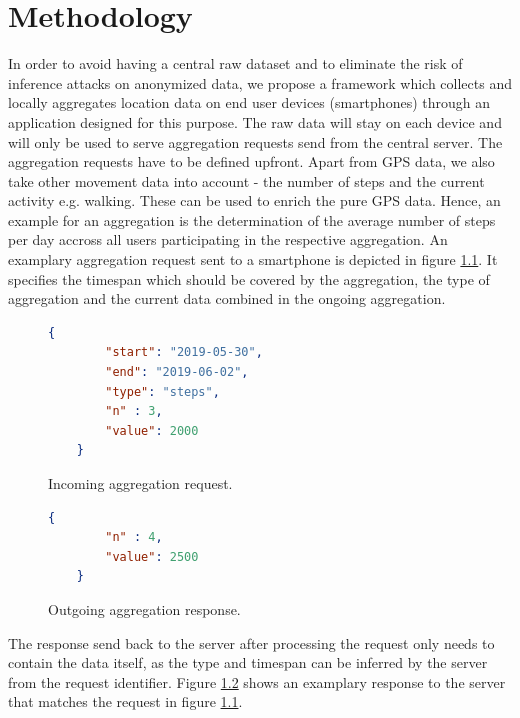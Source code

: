 \chapter{Methodology}\label{chapter:method}
In order to avoid having a central raw dataset and to eliminate the risk of inference attacks on anonymized data, we propose a framework which collects and locally aggregates location data on end user devices (smartphones) through an application designed for this purpose. The raw data will stay on each device and will only be used to serve aggregation requests send from the central server. The aggregation requests have to be defined upfront. Apart from GPS data, we also take other movement data into account - the number of steps and the current activity e.g. walking. These can be used to enrich the pure GPS data. Hence, an example for an aggregation is the determination of the average number of steps per day accross all users participating in the respective aggregation. An examplary aggregation request sent to a smartphone is depicted in figure \ref{incoming-aggregation-request}. It specifies the timespan which should be covered by the aggregation, the type of aggregation and the current data combined in the ongoing aggregation.

\begin{figure}[h!]
	\begin{lstlisting}[language=json,firstnumber=1]
	{
		"start": "2019-05-30",
		"end": "2019-06-02",
		"type": "steps",
		"n" : 3,
		"value": 2000
	}
	\end{lstlisting}
	\caption{Incoming aggregation request.}
	\label{incoming-aggregation-request}
\end{figure}

\begin{figure}[h!]
	\begin{lstlisting}[language=json,firstnumber=1]
	{
		"n" : 4,
		"value": 2500
	}
	\end{lstlisting}
	\caption{Outgoing aggregation response.}
	\label{outgoing-aggregation-response}
\end{figure}

The response send back to the server after processing the request only needs to contain the data itself, as the type and timespan can be inferred by the server from the request identifier. Figure \ref{outgoing-aggregation-response} shows an examplary response to the server that matches the request in figure \ref{incoming-aggregation-request}.


